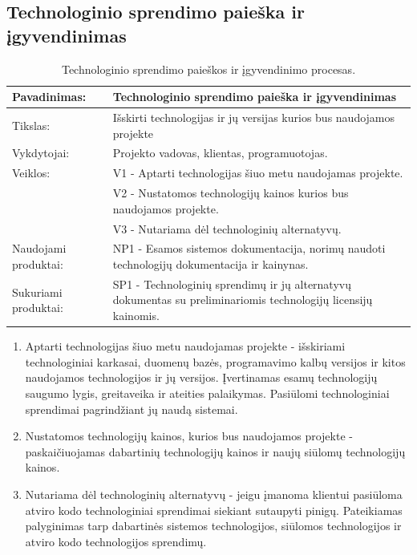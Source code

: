\documentclass{VUMIFPSkursinis}
\begin{document}
	\subsection{Technologinio sprendimo paieška ir įgyvendinimas}

		\begin{center}
			\begin{table}[ht]
				\caption{Technologinio sprendimo paieškos ir įgyvendinimo procesas.}
					\begin{tabular}{ | l | l | } 
						\hline
							Pavadinimas:         & Technologinio sprendimo paieška ir įgyvendinimas                                      \\ \hline
							Tikslas: 	           & Išskirti technologijas ir jų versijas kurios bus naudojamos projekte 							\\ \hline
							Vykdytojai:          & Projekto vadovas, klientas, programuotojas.                             \\ \hline
							Veiklos:             & V1 - Aptarti technologijas šiuo metu naudojamas projekte. 													\\
											 & V2 - Nustatomos technologijų kainos kurios bus naudojamos projekte. \\
											 & V3 - Nutariama dėl technologinių alternatyvų.													\\ \hline
							Naudojami produktai: & NP1 - Esamos sistemos dokumentacija, norimų naudoti technologijų dokumentacija ir kainynas. 													 \\ \hline
							Sukuriami produktai: & SP1 - Technologinių sprendimų ir jų alternatyvų dokumentas su preliminariomis technologijų licensijų kainomis. 								\\ \hline
					\end{tabular}
			\end{table}
		\end{center}

\begin{enumerate}
	\item{Aptarti technologijas šiuo metu naudojamas projekte - išskiriami technologiniai karkasai, duomenų bazės, programavimo kalbų versijos ir kitos naudojamos technologijos ir jų versijos.
	Įvertinamas esamų technologijų saugumo lygis, greitaveika ir ateities palaikymas. 
	Pasiūlomi technologiniai sprendimai pagrindžiant jų naudą sistemai.}
	\item{Nustatomos technologijų kainos, kurios bus naudojamos projekte - paskaičiuojamas dabartinių technologijų kainos ir naujų siūlomų technologijų kainos.}
	\item{Nutariama dėl technologinių alternatyvų - jeigu įmanoma klientui pasiūloma atviro kodo technologiniai sprendimai siekiant sutaupyti pinigų. 
		Pateikiamas palyginimas tarp dabartinės sistemos technologijos, siūlomos technologijos ir atviro kodo technologijos sprendimų. }
\end{enumerate}
	
\end{document}
